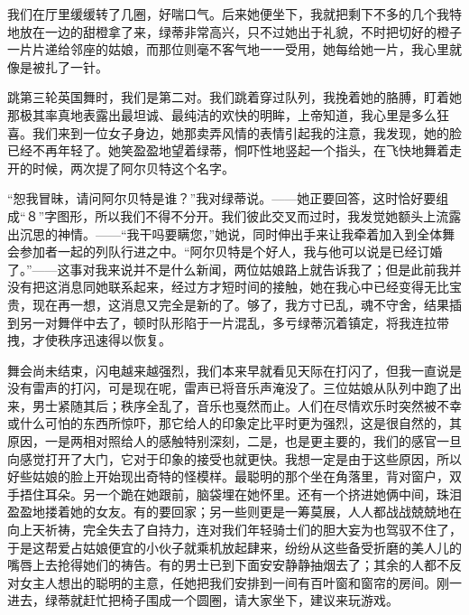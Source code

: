 \documentclass[12pt,oneside]{book}
\begin{document}
我们在厅里缓缓转了几圈，好喘口气。后来她便坐下，我就把剩下不多的几个我特地放在一边的甜橙拿了来，绿蒂非常高兴，只不过她出于礼貌，不时把切好的橙子一片片递给邻座的姑娘，而那位则毫不客气地一一受用，她每给她一片，我心里就像是被扎了一针。

跳第三轮英国舞时，我们是第二对。我们跳着穿过队列，我挽着她的胳膊，盯着她那极其率真地表露出最坦诚、最纯洁的欢快的明眸，上帝知道，我心里是多么狂喜。我们来到一位女子身边，她那卖弄风情的表情引起我的注意，我发现，她的脸已经不再年轻了。她笑盈盈地望着绿蒂，恫吓性地竖起一个指头，在飞快地舞着走开的时候，两次提了阿尔贝特这个名字。

“恕我冒昧，请问阿尔贝特是谁？”我对绿蒂说。——她正要回答，这时恰好要组成“８”字图形，所以我们不得不分开。我们彼此交叉而过时，我发觉她额头上流露出沉思的神情。——“我干吗要瞒您，”她说，同时伸出手来让我牵着加入到全体舞会参加者一起的列队行进之中。“阿尔贝特是个好人，我与他可以说是已经订婚了。”——这事对我来说并不是什么新闻，两位姑娘路上就告诉我了；但是此前我并没有把这消息同她联系起来，经过方才短时间的接触，她在我心中已经变得无比宝贵，现在再一想，这消息又完全是新的了。够了，我方寸已乱，魂不守舍，结果插到另一对舞伴中去了，顿时队形陷于一片混乱，多亏绿蒂沉着镇定，将我连拉带拽，才使秩序迅速得以恢复。

舞会尚未结束，闪电越来越强烈，我们本来早就看见天际在打闪了，但我一直说是没有雷声的打闪，可是现在呢，雷声已将音乐声淹没了。三位姑娘从队列中跑了出来，男士紧随其后；秩序全乱了，音乐也戛然而止。人们在尽情欢乐时突然被不幸或什么可怕的东西所惊吓，那它给人的印象定比平时更为强烈，这是很自然的，其原因，一是两相对照给人的感触特别深刻，二是，也是更主要的，我们的感官一旦向感觉打开了大门，它对于印象的接受也就更快。我想一定是由于这些原因，所以好些姑娘的脸上开始现出奇特的怪模样。最聪明的那个坐在角落里，背对窗户，双手捂住耳朵。另一个跪在她跟前，脑袋埋在她怀里。还有一个挤进她俩中间，珠泪盈盈地搂着她的女友。有的要回家；另一些则更是一筹莫展，人人都战战兢兢地在向上天祈祷，完全失去了自持力，连对我们年轻骑士们的胆大妄为也驾驭不住了，于是这帮爱占姑娘便宜的小伙子就乘机放起肆来，纷纷从这些备受折磨的美人儿的嘴唇上去抢得她们的祷告。有的男士已到下面安安静静抽烟去了；其余的人都不反对女主人想出的聪明的主意，任她把我们安排到一间有百叶窗和窗帘的房间。刚一进去，绿蒂就赶忙把椅子围成一个圆圈，请大家坐下，建议来玩游戏。
\end{document}

